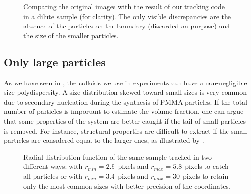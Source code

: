 \begin{figure}
	\ContinuedFloat
	\centering
	\caption{Comparing the original images with the result of our tracking code in a dilute sample (for clarity). The only visible discrepancies are the absence of the particles on the boundary (discarded on purpose) and the size of the smaller particles.}
	\label{fig:compare_image_tracked3D}
\end{figure}

\subsection{Only large particles}

As we have seen in , the colloids we use in experiments can have a non-negligible size polydispersity. A size distribution skewed toward small sizes is very common due to secondary nucleation during the synthesis of \ac{PMMA} particles. If the total number of particles is important to estimate the volume fraction, one can argue that some properties of the system are better caught if the tail of small particles is removed. For instance, structural properties are difficult to extract if the small particles are considered equal to the larger ones, as illustrated by .

\begin{figure}
	\centering
	
	\caption{Radial distribution function of the same sample tracked in two different ways: with $r_{min}=2.9$~pixels and $r_{max}=5.8$~pixels to catch all particles or with $r_{min}=3.4$~pixels and $r_{max}=30$~pixels to retain only the most common sizes with better precision of the coordinates.}
	\label{fig:rdf_tracking}
\end{figure}

